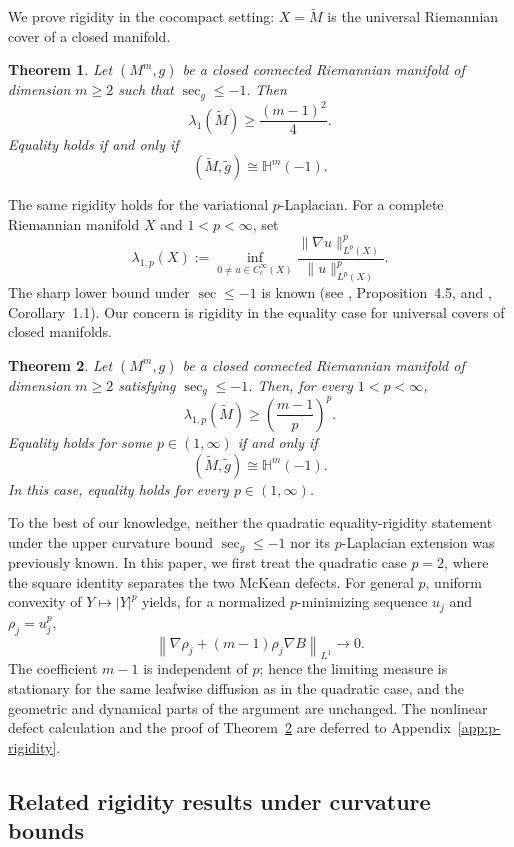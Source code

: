\documentclass[12pt]{amsart}
\newtheorem{theorem}{Theorem}[section]
\theoremstyle{definition}
\numberwithin{equation}{section}
\newcommand{\wti}{\widetilde}
\newcommand{\bH}{\mathbb{H}}
\begin{document}
\medskip
We prove rigidity in the cocompact setting: \(X=\wti M\) is the universal
Riemannian cover of a closed manifold.

\begin{theorem}\label{thm:main}
Let \((M^m,g)\) be a closed connected Riemannian manifold of dimension
\(m\geq2\) such that
\(
  \sec_g\leq-1.
\)
Then
\[
  \lambda_1(\wti M)\geq\frac{(m-1)^2}{4}.
\]
Equality holds if and only if
\[
  (\wti M,\wti g)\cong\bH^m(-1).
\]
\end{theorem}

\medskip
The same rigidity holds for the variational \(p\)-Laplacian.  For a
complete Riemannian manifold \(X\) and \(1<p<\infty\), set
\[
  \lambda_{1,p}(X)
  :=
  \inf_{0\neq u\in C_c^\infty(X)}
  \frac{\|\nabla u\|_{L^p(X)}^p}
       {\|u\|_{L^p(X)}^p}.
\]
The sharp lower bound under \(\sec\leq-1\) is known
(see \cite{Poliquin2014}, Proposition~4.5, and
\cite{CarvalhoCavalcante2022}, Corollary~1.1).  Our concern is rigidity
in the equality case for universal covers of closed manifolds.

\begin{theorem}
\label{thm:p-rigidity}
Let \((M^m,g)\) be a closed connected Riemannian manifold of dimension
\(m\geq2\) satisfying \(\sec_g\leq-1\).  Then, for every
\(1<p<\infty\),
\[
  \lambda_{1,p}(\wti M)
  \geq\left(\frac{m-1}{p}\right)^p.
\]
Equality holds for some \(p\in(1,\infty)\) if and only if
\[
  (\wti M,\wti g)\cong\bH^m(-1).
\]
In this case, equality holds for every \(p\in(1,\infty)\).
\end{theorem}

To the best of our knowledge, neither the quadratic equality-rigidity
statement under the upper curvature bound \(\sec_g\leq-1\) nor its
\(p\)-Laplacian extension was previously known.  In this paper, we first
treat the quadratic case \(p=2\), where the square identity separates the
two McKean defects.  For general \(p\), uniform convexity of
\(Y\mapsto|Y|^p\) yields, for a normalized \(p\)-minimizing sequence
\(u_j\) and \(\rho_j=u_j^p\),
\[
  \left\|
    \nabla\rho_j+(m-1)\rho_j\nabla B
  \right\|_{L^1}
  \longrightarrow0.
\]
The coefficient \(m-1\) is independent of \(p\); hence the limiting measure
is stationary for the same leafwise diffusion as in the quadratic case,
and the geometric and dynamical parts of the argument are unchanged.  The
nonlinear defect calculation and the proof of
Theorem~\ref{thm:p-rigidity} are deferred to
Appendix~\ref{app:p-rigidity}.

\bigskip
\subsection*{Related rigidity results under curvature bounds}
\end{document}
